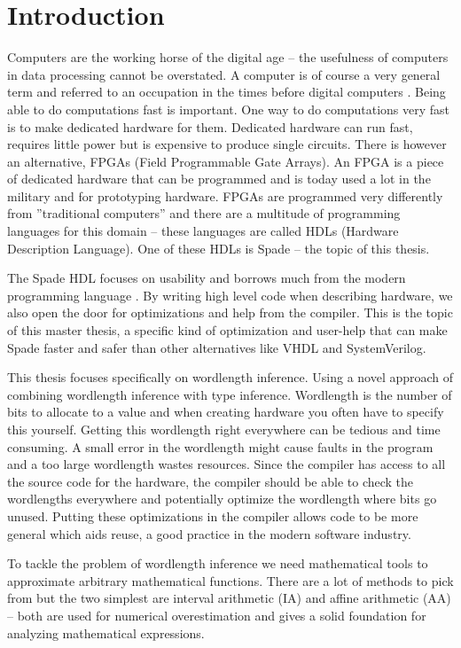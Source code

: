 \chapter{Introduction}
\label{chaIntro}
Computers are the working horse of the digital age -- the usefulness of computers in data processing cannot be overstated. A computer is of course a very general term and referred to an occupation in the times before digital computers \cite{src:ComputerOccupation}. Being able to do computations fast is important. One way to do computations very fast is to make dedicated hardware for them. Dedicated hardware can run fast, requires little power but is expensive to produce single circuits. There is however an alternative, FPGAs (Field Programmable Gate Arrays). An FPGA is a piece of dedicated hardware that can be programmed and is today used a lot in the military and for prototyping hardware. FPGAs are programmed very differently from ''traditional computers'' and there are a multitude of programming languages for this domain -- these languages are called HDLs (Hardware Description Language). One of these HDLs is Spade -- the topic of this thesis.

The Spade HDL focuses on usability and borrows much from the modern programming language \cite{src:spadeSomething} \cite{src:spadeAnHDL}. By writing high level code when describing hardware, we also open the door for optimizations and help from the compiler. This is the topic of this master thesis, a specific kind of optimization and user-help that can make Spade faster and safer than other alternatives like VHDL and SystemVerilog.

This thesis focuses specifically on wordlength inference. Using a novel approach of combining wordlength inference with type inference. Wordlength is the number of bits to allocate to a value and when creating hardware you often have to specify this yourself. Getting this wordlength right everywhere can be tedious and time consuming. A small error in the wordlength might cause faults in the program and a too large wordlength wastes resources.
Since the compiler has access to all the source code for the hardware, the compiler should be able to check the wordlengths everywhere and potentially optimize the wordlength where bits go unused. Putting these optimizations in the compiler allows code to be more general which aids reuse, a good practice in the modern software industry. 

To tackle the problem of wordlength inference we need mathematical tools to approximate arbitrary mathematical functions. There are a lot of methods to pick from but the two simplest are interval arithmetic (IA) and affine arithmetic (AA) -- both are used for numerical overestimation and gives a solid foundation for analyzing mathematical expressions.

